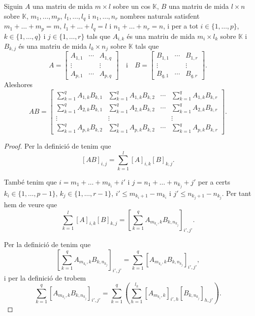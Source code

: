 \documentclass[../Apunts.tex]{subfiles}
\begin{document}
	\begin{proposition}
		\label{prop:producte de matrius en blocs}
		Siguin \(A\) una matriu de mida \(m\times l\) sobre un cos \(\mathbb{K}\), \(B\) una matriu de mida \(l\times n\) sobre \(\mathbb{K}\), \(m_{1},\dots,m_{p}\), \(l_{1},\dots,l_{q}\) i \(n_{1},\dots,n_{r}\) nombres naturals satisfent \(m_{1}+\dots+m_{p}=m\), \(l_{1}+\dots+l_{q}=l\) i \(n_{1}+\dots+n_{r}=n\), i per a tot \(i\in\{1,\dots,p\}\), \(k\in\{1,\dots,q\}\) i \(j\in\{1,\dots,r\}\) tals que \(A_{i,k}\) és una matriu de mida \(m_{i}\times l_{k}\) sobre \(\mathbb{K}\) i \(B_{k,j}\) és una matriu de mida \(l_{k}\times n_{j}\) sobre \(\mathbb{K}\) tals que
		\[A=\left[\begin{matrix}
		A_{1,1} & \cdots & A_{1,q} \\
		\vdots & & \vdots \\
		A_{p,1} & \cdots & A_{p,q}
		\end{matrix}\right]\quad\text{i}\quad B=\left[\begin{matrix}
		B_{1,1} & \cdots & B_{1,r} \\
		\vdots & & \vdots \\
		B_{q,1} & \cdots & B_{q,r}
		\end{matrix}\right].\]
		Aleshores
		\[AB=\left[\begin{matrix}
		\sum_{k=1}^{q}A_{1,k}B_{k,1} & \sum_{k=1}^{q}A_{1,k}B_{k,2} & \cdots & \sum_{k=1}^{q}A_{1,k}B_{k,r} \\
		\sum_{k=1}^{q}A_{2,k}B_{k,1} & \sum_{k=1}^{q}A_{2,k}B_{k,2} & \cdots & \sum_{k=1}^{q}A_{2,k}B_{k,r} \\
		\vdots & \vdots & & \vdots \\
		\sum_{k=1}^{q}A_{p,k}B_{k,2} & \sum_{k=1}^{q}A_{p,k}B_{k,2} & \cdots & \sum_{k=1}^{q}A_{p,k}B_{k,r}
		\end{matrix}\right].\]
		\begin{proof}
			Per la definició de  tenim que
			\[[AB]_{i,j}=\sum_{k=1}^{l}[A]_{i,k}[B]_{k,j}.\]
			
			També tenim que \(i=m_{1}+\dots+m_{k_{i}}+i'\) i \(j=n_{1}+\dots+n_{k_{j}}+j'\) per a certs \(k_{i}\in\{1,\dots,p-1\}\), \(k_{j}\in\{1,\dots,r-1\}\), \(i'\leq m_{k_{i}+1}-m_{k_{i}}\) i \(j'\leq n_{k_{j}+1}-n_{k_{j}}\). Per tant hem de veure que
			\[\sum_{k=1}^{l}[A]_{i,k}[B]_{k,j}=\left[\sum_{k=1}^{q}A_{m_{k_{i}},k}B_{k,n_{k_{j}}}\right]_{i',j'}.\]
			
			Per la definició de  tenim que
			\[\left[\sum_{k=1}^{q}A_{m_{k_{i}},k}B_{k,n_{k_{j}}}\right]_{i',j'}=\sum_{k=1}^{q}[A_{m_{k_{i}},k}B_{k,n_{k_{j}}}]_{i',j'},\]
			i per la definició de  trobem
			\[\sum_{k=1}^{q}[A_{m_{k_{i}},k}B_{k,n_{k_{j}}}]_{i',j'}=\sum_{k=1}^{q}\left(\sum_{h=1}^{l_{k}}[A_{m_{k_{i}},k}]_{i',h}[B_{k,n_{k_{j}}}]_{h,j'}\right).\]
			

\end{proof}
\end{proposition}
\end{document}

